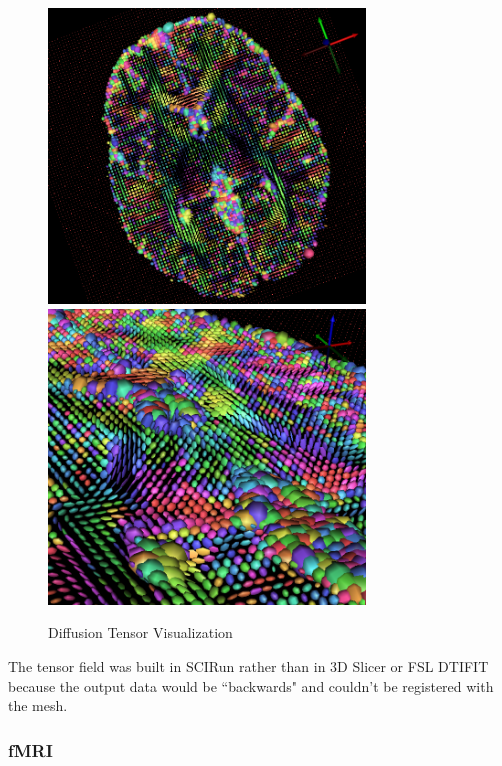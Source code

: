 \begin{figure}[p]
\begin{center}
\includegraphics[width=0.75\textwidth]{Figures/DTI_1.png}
\includegraphics[width=0.75\textwidth]{Figures/DTI_2.png}
\caption{Diffusion Tensor Visualization}
\label{fig:tensorvis}
\end{center}
\end{figure}

The tensor field was built in SCIRun rather than in 3D Slicer \cite{ref:slicer} or FSL DTIFIT because the output data would be ``backwards" and couldn't be registered with the mesh. 

\subsubsection{fMRI}
\label{sec:fmripre}

